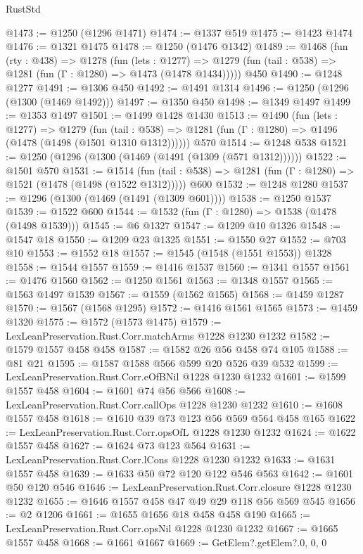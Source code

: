 \begin{lexlean}{RustStd}
\begin{coremodule}
{\begin{coremodule}
{{{{{{{{{{{{{@1473 := @1250 (@1296 @1471)
@1474 := @1337 @519
@1475 := @1423 @1474
@1476 := @1321 @1475
@1478 := @1250 (@1476 @1342)
@1489 := @1468
    (fun (rty : @438) =>
    @1278
      (fun (lets : @1277) =>
      @1279 (fun (tail : @538) => @1281 (fun (Γ : @1280) => @1473 (@1478 @1434)))))
    @450
@1490 := @1248 @1277
@1491 := @1306 @450
@1492 := @1491 @1314
@1496 := @1250 (@1296 (@1300 (@1469 @1492)))
@1497 := @1350 @450
@1498 := @1349 @1497
@1499 := @1353 @1497
@1501 := @1499 @1428 @1430
@1513 := @1490
    (fun (lets : @1277) =>
    @1279
      (fun (tail : @538) => @1281 (fun (Γ : @1280) => @1496 (@1478 (@1498 (@1501 @1310 @1312))))))
    @570
@1514 := @1248 @538
@1521 := @1250 (@1296 (@1300 (@1469 (@1491 (@1309 (@571 @1312))))))
@1522 := @1501 @570
@1531 := @1514
    (fun (tail : @538) => @1281 (fun (Γ : @1280) => @1521 (@1478 (@1498 (@1522 @1312)))))
    @600
@1532 := @1248 @1280
@1537 := @1296 (@1300 (@1469 (@1491 (@1309 @601))))
@1538 := @1250 @1537
@1539 := @1522 @600
@1544 := @1532 (fun (Γ : @1280) => @1538 (@1478 (@1498 @1539)))
@1545 := @6 @1327
@1547 := @1209 @10 @1326
@1548 := @1547 @18
@1550 := @1209 @23 @1325
@1551 := @1550 @27
@1552 := @703 @10
@1553 := @1552 @18
@1557 := @1545 (@1548 (@1551 @1553)) @1328
@1558 := @1544 @1557
@1559 := @1416 @1537
@1560 := @1341 @1557
@1561 := @1476 @1560
@1562 := @1250 @1561
@1563 := @1348 @1557
@1565 := @1563 @1497 @1539
@1567 := @1559 (@1562 @1565)
@1568 := @1459 @1287
@1570 := @1567 (@1568 @1295)
@1572 := @1416 @1561 @1565
@1573 := @1459 @1320
@1575 := @1572 (@1573 @1475)
@1579 := LexLeanPreservation.Rust.Corr.matchArms @1228 @1230 @1232
@1582 := @1579 @1557 @458 @458
@1587 := @1582 @26 @56 @458 @74 @105
@1588 := @81 @21
@1595 := @1587 @1588 @566 @599 @20 @526 @39 @532
@1599 := LexLeanPreservation.Rust.Corr.eOfBNil @1228 @1230 @1232
@1601 := @1599 @1557 @458
@1604 := @1601 @74 @56 @566
@1608 := LexLeanPreservation.Rust.Corr.callOps @1228 @1230 @1232
@1610 := @1608 @1557 @458
@1618 := @1610 @39 @73 @123 @56 @569 @564 @458 @165
@1622 := LexLeanPreservation.Rust.Corr.opsOfL @1228 @1230 @1232
@1624 := @1622 @1557 @458
@1627 := @1624 @73 @123 @564
@1631 := LexLeanPreservation.Rust.Corr.lCons @1228 @1230 @1232
@1633 := @1631 @1557 @458
@1639 := @1633 @50 @72 @120 @122 @546 @563
@1642 := @1601 @50 @120 @546
@1646 := LexLeanPreservation.Rust.Corr.closure @1228 @1230 @1232
@1655 := @1646 @1557 @458 @47 @49 @29 @118 @56 @569 @545
@1656 := @2 @1206
@1661 := @1655 @1656 @18 @458 @458 @190
@1665 := LexLeanPreservation.Rust.Corr.opsNil @1228 @1230 @1232
@1667 := @1665 @1557 @458
@1668 := @1661 @1667
@1669 := GetElem?.getElem?.{0, 0, 0}
}}}}}}}}}}}}}
\end{coremodule}}
\end{coremodule}
\end{lexlean}
